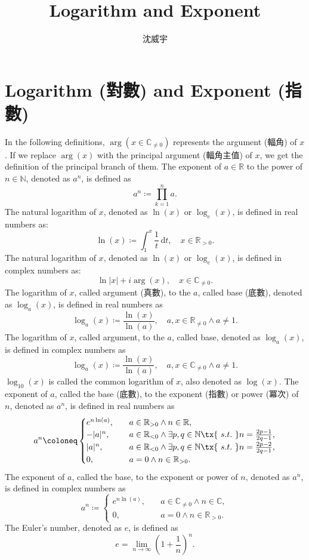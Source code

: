 \documentclass[a4paper,12pt]{article}
\begin{document}
\title{Logarithm and Exponent}
\author{沈威宇}
\date{\temtoday}
\titletocdoc
\section{Logarithm (對數) and Exponent (指數)}
In the following definitions, $\arg(x\in\mathbb{C}_{\neq 0})$ represents the argument (輻角) of $x$. If we replace $\arg(x)$ with the principal argument (輻角主值) of $x$, we get the definition of the principal branch of them.
The exponent of $a\in\mathbb{R}$ to the power of $n\in\mathbb{N}$, denoted as $a^n$, is defined as
\[a^n\coloneq\prod_{k=1}^na.\]
The natural logarithm of $x$, denoted as $\ln(x)$ or $\log_e(x)$, is defined in real numbers as:
\[\ln(x)\coloneq\int_1^x\frac{1}{t}\,\mathrm{d}t,\quad x\in\mathbb{R}_{>0}.\]
The natural logarithm of $x$, denoted as $\ln(x)$ or $\log_e(x)$, is defined in complex numbers as:
\[\ln|x|+i\arg(x),\quad x\in\mathbb{C}_{\neq 0}.\]
The logarithm of $x$, called argument (真數), to the $a$, called base (底數), denoted as $\log_a(x)$, is defined in real numbers as
\[\log_a(x)\coloneq\frac{\ln(x)}{\ln(a)},\quad a,x\in\mathbb{R}_{\neq 0}\land a\neq 1.\]
The logarithm of $x$, called argument, to the $a$, called base, denoted as $\log_a(x)$, is defined in complex numbers as
\[\log_a(x)\coloneq\frac{\ln(x)}{\ln(a)},\quad a,x\in\mathbb{C}_{\neq 0}\land a\neq 1.\]
$\log_{10}(x)$ is called the common logarithm of $x$, also denoted as $\log(x)$.
The exponent of $a$, called the base (底數), to the exponent (指數) or power (冪次) of $n$, denoted as $a^n$, is defined in real numbers as
\[a^n\coloneq\begin{cases}
e^{n\ln(a)},\quad & a\in\mathbb{R}_{>0}\land n\in\mathbb{R},\\
-|a|^n,\quad & a\in\mathbb{R}_{<0}\land \exists p,q\in\mathbb{N}\tx{\ s.t.\ } n=\frac{2p-1}{2q-1},\\
|a|^n,\quad & a\in\mathbb{R}_{<0}\land \exists p,q\in\mathbb{N}\tx{\ s.t.\ } n=\frac{2p-2}{2q-1},\\
0,\quad & a=0\land n\in\mathbb{R}_{>0}.
\end{cases}\]
The exponent of $a$, called the base, to the exponent or power of $n$, denoted as $a^n$, is defined in complex numbers as
\[a^n\coloneq\begin{cases}
e^{n\ln(a)},\quad & a\in\mathbb{C}_{\neq 0}\land n\in\mathbb{C},\\
0,\quad & a=0\land n\in\mathbb{R}_{>0}.
\end{cases}\]
The Euler's number, denoted as $e$, is defined as
\[e=\lim_{n\to\infty}\left(1+\frac{1}{n}\right)^n.\]
\end{document}

